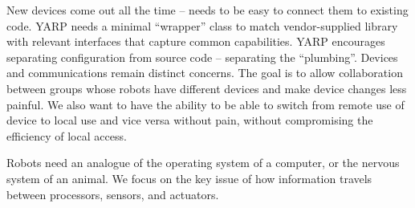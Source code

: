 





New devices come out all the time -- needs to be easy to connect them
to existing code.  YARP needs a minimal ``wrapper'' class to match
vendor-supplied library with relevant interfaces that capture common
capabilities.  YARP encourages separating configuration from source
code -- separating the ``plumbing''.  Devices and communications
remain distinct concerns.  The goal is to allow collaboration between
groups whose robots have different devices and make device changes
less painful.  We also want to have the ability to be able to switch
from remote use of device to local use and vice versa without pain,
without compromising the efficiency of local access.

Robots need an analogue of the operating system of a computer, or the
nervous system of an animal.  We focus on the key issue of how information
travels between processors, sensors, and actuators.
